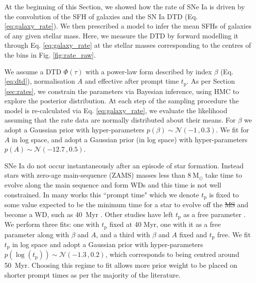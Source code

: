 \documentclass[fleqn,usenatbib]{mnras}
\providecommand{\DIFadd}[1]{{\protect\color{blue}\uwave{#1}}} %
\providecommand{\DIFdel}[1]{{\protect\color{red}\sout{#1}}}                      %
\providecommand{\DIFaddbegin}{} %
\providecommand{\DIFaddend}{} %
\providecommand{\DIFdelbegin}{} %
\providecommand{\DIFdelend}{} %
\newcommand{\DIFscaledelfig}{0.5}
\newlength{\DIFdelgraphicswidth} %
\newlength{\DIFdelgraphicsheight} %
\newcommand{\DIFaddincludegraphics}[2][]{{\color{blue}\fbox{\DIFOincludegraphics[#1]{#2}}}} %
\newcommand{\DIFdelincludegraphics}[2][]{%
\sbox{\DIFdelgraphicsbox}{\DIFOincludegraphics[#1]{#2}}%
\settoboxwidth{\DIFdelgraphicswidth}{\DIFdelgraphicsbox} %
\settoboxtotalheight{\DIFdelgraphicsheight}{\DIFdelgraphicsbox} %
\scalebox{\DIFscaledelfig}{%
\parbox[b]{\DIFdelgraphicswidth}{\usebox{\DIFdelgraphicsbox}\\[-\baselineskip] \rule{\DIFdelgraphicswidth}{0em}}\llap{\resizebox{\DIFdelgraphicswidth}{\DIFdelgraphicsheight}{%
\setlength{\unitlength}{\DIFdelgraphicswidth}%
\begin{picture}(1,1)%
\thicklines\linethickness{2pt} %
{\color[rgb]{1,0,0}\put(0,0){\framebox(1,1){}}}%
{\color[rgb]{1,0,0}\put(0,0){\line( 1,1){1}}}%
{\color[rgb]{1,0,0}\put(0,1){\line(1,-1){1}}}%
\end{picture}%
}\hspace*{3pt}}} %
} %
\DeclareRobustCommand{\DIFaddbegin}{\DIFOaddbegin \let\includegraphics\DIFaddincludegraphics} %
\DeclareRobustCommand{\DIFaddend}{\DIFOaddend \let\includegraphics\DIFOincludegraphics} %
\DeclareRobustCommand{\DIFdelbegin}{\DIFOdelbegin \let\includegraphics\DIFdelincludegraphics} %
\DeclareRobustCommand{\DIFdelend}{\DIFOaddend \let\includegraphics\DIFOincludegraphics} %
\begin{document}
At the beginning of this Section, we showed how the rate of SNe Ia is driven by the convolution of the SFH of galaxies and the SN Ia DTD (Eq. \ref{eq:galaxy_rate}). We then prescribed a model to infer the mean SFHs of galaxies of any given stellar mass. Here, we measure the DTD by forward modelling it through Eq. \ref{eq:galaxy_rate} at the stellar masses corresponding to the centres of the bins in Fig. \ref{fig:rate_raw}. 

We assume a DTD $\Phi(\tau)$ with a power-law form described by index $\beta$ (Eq. \ref{eq:dtd}), normalisation $A$ and effective after prompt time $t_{\mathrm{p}}$. As per Section \ref{sec:rates}, we constrain the parameters via Bayesian inference, using HMC to explore the posterior distribution. At each step of the sampling procedure the model is re-calculated via Eq. \ref{eq:galaxy_rate}, we evaluate the likelihood assuming that the rate data are normally distributed about their means. For $\beta$ we adopt a Gaussian prior with hyper-parameters $p(\beta) \sim \mathcal{N}(-1\,,0.3)$. We fit for $A$ in log space, and adopt a Gaussian prior (in log space) with hyper-parameters $p(A) \sim \mathcal{N}(-12.7\,, 0.5)$.

SNe Ia do not occur instantaneously after an episode of star formation. Instead stars with zero-age main-sequence (ZAMS) masses less than $8~\mathrm{M}_{\odot}$ take time to evolve along the main sequence and form WDs and this time is not well constrained. In many works this ``prompt time" which we denote $t_{\mathrm{p}}$ is fixed to some value expected to be the minimum time for a star to evolve off the \DIFdelbegin \DIFdel{MS }\DIFdelend \DIFaddbegin \DIFadd{main sequence }\DIFaddend and become a WD, such as 40~Myr \citep{Maoz2012,Graur2013,Graur2014}. Other studies have left $t_{\mathrm{p}}$ as a free parameter \citep{Heringer2019,Castrillo2020}. We perform three fits: one with $t_{\mathrm{p}}$ fixed at 40 Myr, one with it as a free parameter along with $\beta$ and $A$, and a third with $\beta$ and $A$ fixed and  $t_{\mathrm{p}}$ free. We fit $t_{\mathrm{p}}$ in log space and adopt a Gaussian prior with hyper-parameters $p(\log(t_{\mathrm{p}})) \sim \mathcal{N}(-1.3\,,0.2)$, which corresponds to being centred around 50~Myr. Choosing this regime to fit allows more prior weight to be placed on shorter prompt times as per the majority of the literature. 
\end{document}
